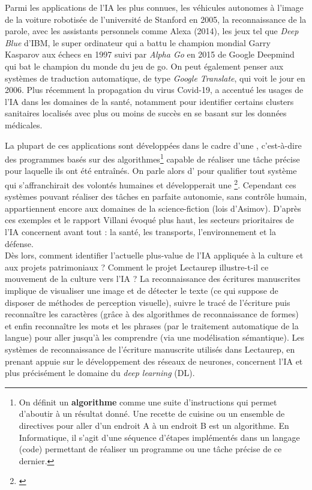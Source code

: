 Parmi les applications de l'IA les plus connues, les véhicules autonomes à l'image de la voiture robotisée de l'université de Stanford en 2005, la reconnaissance de la parole, avec les assistants personnels comme Alexa (2014), les jeux tel que \textit{Deep Blue} d'IBM, le super ordinateur qui a battu le champion mondial Garry Kasparov aux échecs en 1997 suivi par \textit{Alpha Go} en 2015 de Google Deepmind qui bat le champion du monde du jeu de go. On peut également penser aux systèmes de traduction automatique, de type \textit{Google Translate}, qui voit le jour en 2006. Plus récemment la propagation du virus Covid-19, a accentué les usages de l'IA dans les domaines de la santé, notamment pour identifier certains clusters sanitaires localisés avec plus ou moins de succès en se basant sur les données médicales. 

La plupart de ces applications sont développées dans le cadre d'une , c'est-à-dire des programmes basés sur des algorithmes\footnote{On définit un \textbf{algorithme} comme une suite d'instructions qui permet d'aboutir à un résultat donné. Une recette de cuisine ou un ensemble de directives pour aller d'un endroit A à un endroit B est un algorithme. En Informatique, il s'agit d'une séquence d'étapes implémentés dans un langage (code) permettant de réaliser un programme ou une tâche précise de ce dernier.} capable de réaliser une tâche précise pour laquelle ils ont été entraînés. On parle alors d' pour qualifier tout système qui s'affranchirait des volontés humaines et développerait une \footnote{\cite{ganascia_mythe_nodate}}. Cependant ces systèmes pouvant réaliser des tâches en parfaite autonomie, sans contrôle humain, appartiennent encore aux domaines de la science-fiction (lois d'Asimov). D'après ces exemples et le rapport Villani évoqué plus haut, les secteurs prioritaires de l'IA concernent avant tout : la santé, les transports, l'environnement et la défense. \\

Dès lors, comment identifier l'actuelle plus-value de l'IA appliquée à la culture et aux projets patrimoniaux ? Comment le projet Lectaurep illustre-t-il ce mouvement de la culture vers l'IA ? 
La reconnaissance des écritures manuscrites implique de visualiser une image et de détecter le texte (ce qui suppose de disposer de méthodes de perception visuelle), suivre le tracé de l'écriture puis reconnaître les caractères (grâce à des algorithmes de reconnaissance de formes) et enfin reconnaître les mots et les phrases (par le traitement automatique de la langue) pour aller jusqu'à les comprendre (via une modélisation sémantique). Les systèmes de reconnaissance de l'écriture manuscrite utilisés dans Lectaurep, en prenant appuie sur le développement des réseaux de neurones, concernent l'IA et plus précisément le domaine du \textit{deep learning} (DL).\\

